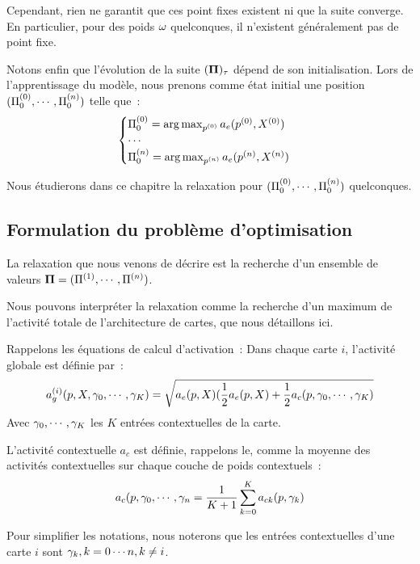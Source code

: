 \documentclass[../main]{subfiles}
\begin{document}
Cependant, rien ne garantit que ces point fixes existent ni que la suite converge.
En particulier, pour des poids $\omega$ quelconques, il n'existent généralement pas de point fixe.

Notons enfin que l'évolution de la suite $(\mathbf{\Pi})_{\tau}$ dépend de son initialisation.
Lors de l'apprentissage du modèle, nous prenons comme état initial une position $(\Pi^{({0})}_0, \cdots , \Pi^{({n})}_0)$  telle que~: 
\begin{equation}
\begin{cases}
\Pi^{({0})}_0 = \operatorname*{arg\,max}_{p^{({0})}} a_e(p^{({0})},X^{({0})})\\
\cdots \\
\Pi^{({n})}_0 = \operatorname*{arg\,max}_{p^{({n})}} a_e(p^{({n})},X^{({n})})\\
\end{cases}
\label{eq:init}
\end{equation}

Nous étudierons dans ce chapitre la relaxation pour $(\Pi^{({0})}_0, \cdots , \Pi^{({n})}_0)$ quelconques.

\subsection{Formulation du problème d'optimisation}

La relaxation que nous venons de décrire est la recherche d'un ensemble de valeurs $\mathbf{\Pi} = (\Pi^{({1})}, \cdots, \Pi^{({n})})$.

Nous pouvons interpréter la relaxation comme la recherche d'un maximum de l'activité totale de l'architecture de cartes, que nous détaillons ici. 

Rappelons les équations de calcul d'activation~:
Dans chaque carte $i$, l'activité globale est définie par~:
\begin{equation}\label{eq:ag}
	a_g^{({i})}(p, X, \gamma_0, \cdots, \gamma_K) = \sqrt{a_e(p,X)(\frac{1}{2}a_e(p,X) + \frac{1}{2}a_c(p,\gamma_0, \cdots, \gamma_K)}
\end{equation}
Avec $\gamma_0, \cdots, \gamma_K$ les $K$ entrées contextuelles de la carte. 

L'activité contextuelle $a_c$ est définie, rappelons le, comme la moyenne des activités contextuelles sur chaque couche de poids contextuels~:
\begin{equation}
	a_c(p, \gamma_0, \cdots, \gamma_n = \frac{1}{K+1}\sum_{k=0}^{K}{a_{ck}(p, \gamma_k)}
\end{equation}

Pour simplifier les notations, nous noterons que les entrées contextuelles d'une carte $i$ sont ${\gamma_k, k = 0 \cdots n , k \neq i}$.
\end{document}
